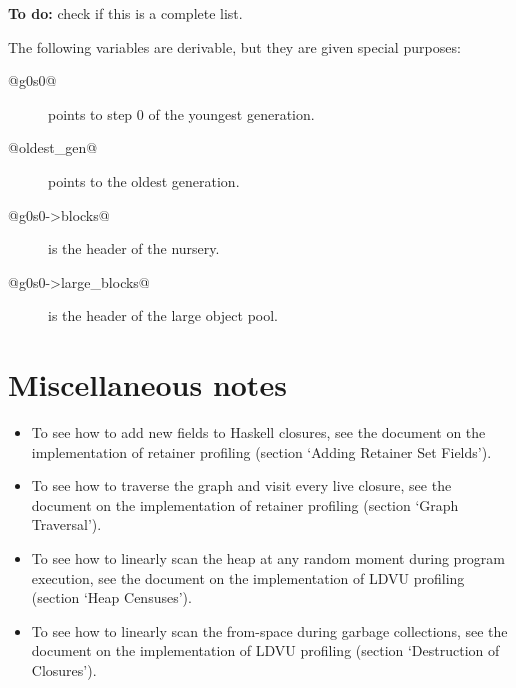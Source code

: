 \documentclass{article}
\begin{document}
\textbf{To do:} check if this is a complete list.

The following variables are derivable, but they are given special purposes:

\begin{description}
\item[@g0s0@] points to step 0 of the youngest generation.
\item[@oldest\_gen@] points to the oldest generation.
\item[@g0s0->blocks@] is the header of the nursery.
\item[@g0s0->large\_blocks@] is the header of the large object pool.
\end{description}

\section{Miscellaneous notes}

\begin{itemize}
\item To see how to add new fields to Haskell closures, 
see the document on the implementation of retainer profiling 
(section `Adding Retainer Set Fields').

\item To see how to traverse the graph and visit every live closure,
see the document on the implementation of retainer profiling
(section `Graph Traversal').

\item To see how to linearly scan the heap at any random moment during
program execution, see the document on the implementation of LDVU profiling
(section `Heap Censuses').

\item To see how to linearly scan the from-space during garbage collections,
see the document on the implementation of LDVU profiling
(section `Destruction of Closures').

\end{itemize}
\end{document}
